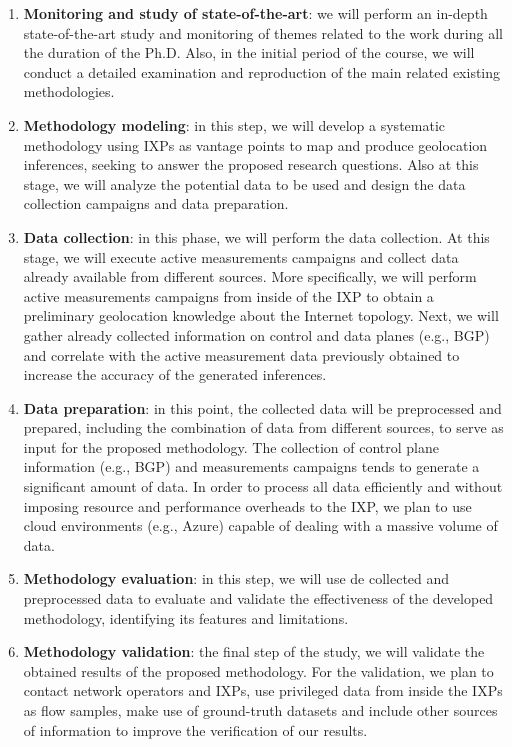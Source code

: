\begin{enumerate}
\item {\bf Monitoring and study of state-of-the-art}: we will perform an in-depth state-of-the-art study and monitoring of themes related to the work during all the duration of the Ph.D. Also, in the initial period of the course, we will conduct a detailed examination and reproduction of the main related existing methodologies.

\item {\bf Methodology modeling}: in this step, we will develop a systematic methodology using IXPs as vantage points to map and produce geolocation inferences, seeking to answer the proposed research questions. Also at this stage, we will analyze the potential data to be used and design the data collection campaigns and data preparation.

\item {\bf Data collection}: in this phase, we will perform the data collection. At this stage, we will execute active measurements campaigns and collect data already available from different sources. More specifically, we will perform active measurements campaigns from inside of the IXP to obtain a preliminary geolocation knowledge about the Internet topology. Next, we will gather already collected information on control and data planes (e.g., BGP) and correlate with the active measurement data previously obtained to increase the accuracy of the generated inferences.

\item {\bf Data preparation}: in this point, the collected data will be preprocessed and prepared, including the combination of data from different sources, to serve as input for the proposed methodology. The collection of control plane information (e.g., BGP) and measurements campaigns tends to generate a significant amount of data. In order to process all data efficiently and without imposing resource and performance overheads to the IXP, we plan to use cloud environments (e.g., Azure) capable of dealing with a massive volume of data.

\item {\bf Methodology evaluation}: in this step, we will use de collected and preprocessed data to evaluate and validate the effectiveness of the developed methodology, identifying its features and limitations.

\item {\bf Methodology validation}: the final step of the study, we will validate the obtained results of the proposed methodology. For the validation, we plan to contact network operators and IXPs, use privileged data from inside the IXPs as flow samples, make use of ground-truth datasets and include other sources of information to improve the verification of our results. 


\end{enumerate}
